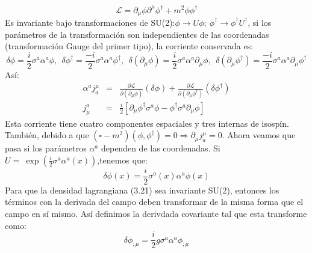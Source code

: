 \begin{equation}
\mathcal{L}=\partial_{\mu}\phi\partial^{\mu}\phi^{\dagger}+m^{2}\phi\phi^{\dagger}
\end{equation}
Es invariante bajo transformaciones de SU(2):$\phi\to U\phi;\ \phi^\dagger\to\phi^\dagger U^\dagger$, si los parámetros de la transformación son independientes de las coordenadas (transformación Gauge del primer tipo), la corriente conservada es:
\begin{equation}
\delta\phi=\frac{i}{2}\sigma^{a}\alpha^{a}\phi,\ \ \delta\phi^{\dagger}=\frac{-i}{2}\sigma^{a}\alpha^{a}\phi^{\dagger},\ \ \delta(\partial_{\mu}\phi)=\frac{i}{2}\sigma^{a}\alpha^{a}\partial_{\mu}\phi,\ \ \delta(\partial_{\mu}\phi^{\dagger})=\frac{-i}{2}\sigma^{a}\alpha^{a}\partial_{\mu}\phi^{\dagger}
\end{equation}
Así:
\begin{eqnarray}
\nonumber \alpha^{a}j_{a}^{\mu}&=&\frac{\partial\mathcal{L}}{\partial(\partial_{\mu}\phi)}(\delta\phi)+\frac{\partial\mathcal{L}}{\partial(\partial_{\mu}\phi^{\dagger})}(\delta\phi^{\dagger})\\
j^{a}_{\mu}&=& \frac{i}{2}[\partial_{\mu}\phi^{\dagger}\sigma^{a}\phi-\phi^{\dagger}\sigma^{a}\partial_{\mu}\phi]
\end{eqnarray}
Esta corriente tiene cuatro componentes espaciales y tres internas de isospín. También, debido a que $(\square-m^2)(\phi,\phi^\dagger)=0\Rightarrow \partial_\mu j^{\mu}_{a}=0$. Ahora veamos que pasa si los parámetros $\alpha^a$ dependen de las coordenadas. Si $U=\ \exp\left(\frac{i}{2}\sigma^a\alpha^a(x)\right)$,tenemos que:
\begin{equation}
\delta\phi(x)=\frac{i}{2}\sigma^{a}(x)\alpha^{a}\phi(x)
\end{equation}
Para que la densidad lagrangiana (3.21) sea invariante SU(2), entonces los términos con la derivada del campo deben transformar de la misma forma que el campo en sí mismo. Así definimos la derivdada covariante tal que esta transforme como:
\begin{equation}
\delta\phi_{;\mu}=\frac{i}{2}g\sigma^{a}\alpha^{a}\phi_{;\mu}
\end{equation}  
\\

